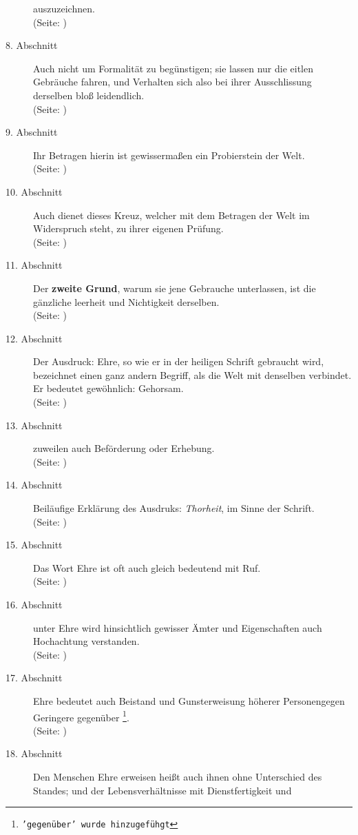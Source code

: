 \begin{description}
auszuzeichnen.
\\ (Seite: \pageref{kap9_ab7})
\item[8. Abschnitt] Auch nicht um Formalität zu begünstigen; sie lassen nur die
eitlen Gebräuche fahren, und Verhalten sich also bei ihrer Ausschlissung
derselben bloß leidendlich.
\\ (Seite: \pageref{kap9_ab8})
\item[9. Abschnitt] Ihr Betragen hierin ist gewissermaßen ein Probierstein der
Welt.
\\ (Seite: \pageref{kap9_ab9})
\item[10. Abschnitt] Auch dienet dieses Kreuz, welcher mit dem Betragen der Welt
im Widerspruch steht, zu ihrer eigenen Prüfung.
\\ (Seite: \pageref{kap9_ab10})
\item[11. Abschnitt] Der \textbf{zweite Grund}, warum sie jene Gebrauche
unterlassen, ist
die gänzliche leerheit und Nichtigkeit derselben.
\\ (Seite: \pageref{kap9_ab11})
\item[12. Abschnitt] Der Ausdruck: Ehre, so wie er in der heiligen Schrift
gebraucht wird, bezeichnet einen ganz andern Begriff, als die Welt mit denselben
verbindet. Er bedeutet gewöhnlich: Gehorsam.
\\ (Seite: \pageref{kap9_ab12})
\item[13. Abschnitt] zuweilen auch Beförderung oder Erhebung.
\\ (Seite: \pageref{kap9_ab13})
\item[14. Abschnitt] Beiläufige Erklärung des Ausdruks: \textit{Thorheit}, im
Sinne
der Schrift.
\\ (Seite: \pageref{kap9_ab14})
\item[15. Abschnitt] Das Wort Ehre ist oft auch gleich bedeutend mit Ruf.
\\ (Seite: \pageref{kap9_ab15})
\item[16. Abschnitt] unter Ehre wird hinsichtlich gewisser Ämter und
Eigenschaften auch Hochachtung verstanden.
\\ (Seite: \pageref{kap9_ab16})
\item[17. Abschnitt] Ehre bedeutet auch Beistand und Gunsterweisung höherer
Personengegen Geringere gegenüber
\footnote{\texttt{'gegenüber' wurde hinzugefühgt}}.
\\ (Seite: \pageref{kap9_ab17})
\item[18. Abschnitt]  Den Menschen Ehre erweisen heißt auch ihnen ohne
Unterschied des Standes; und der Lebensverhältnisse mit Dienstfertigkeit und

\end{description}
